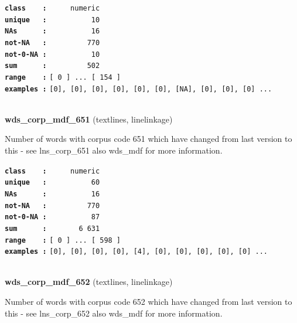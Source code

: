 \documentclass[]{article}
\begin{document}
\textbf{\texttt{class\ \ \ \ :}} \texttt{~~~~~numeric}\\
\textbf{\texttt{unique\ \ \ :}} \texttt{~~~~~~~~~~10}\\
\textbf{\texttt{NAs\ \ \ \ \ \ :}} \texttt{~~~~~~~~~~16}\\
\textbf{\texttt{not-NA\ \ \ :}} \texttt{~~~~~~~~~770}\\
\textbf{\texttt{not-0-NA\ :}} \texttt{~~~~~~~~~~10}\\
\textbf{\texttt{sum\ \ \ \ \ \ :}} \texttt{~~~~~~~~~502}\\
\textbf{\texttt{range\ \ \ \ :}}
\texttt{{[}\ 0\ {]}\ ...\ {[}\ 154\ {]}}\\
\textbf{\texttt{examples\ :}}
\texttt{{[}0{]},\ {[}0{]},\ {[}0{]},\ {[}0{]},\ {[}0{]},\ {[}0{]},\ {[}NA{]},\ {[}0{]},\ {[}0{]},\ {[}0{]}\ ...}\\

~

\textbf{wds\_corp\_mdf\_651} (textlines, linelinkage)

Number of words with corpus code 651 which have changed from last
version to this - see lns\_corp\_651 also wds\_mdf for more information.

\textbf{\texttt{class\ \ \ \ :}} \texttt{~~~~~numeric}\\
\textbf{\texttt{unique\ \ \ :}} \texttt{~~~~~~~~~~60}\\
\textbf{\texttt{NAs\ \ \ \ \ \ :}} \texttt{~~~~~~~~~~16}\\
\textbf{\texttt{not-NA\ \ \ :}} \texttt{~~~~~~~~~770}\\
\textbf{\texttt{not-0-NA\ :}} \texttt{~~~~~~~~~~87}\\
\textbf{\texttt{sum\ \ \ \ \ \ :}} \texttt{~~~~~~~6~631}\\
\textbf{\texttt{range\ \ \ \ :}}
\texttt{{[}\ 0\ {]}\ ...\ {[}\ 598\ {]}}\\
\textbf{\texttt{examples\ :}}
\texttt{{[}0{]},\ {[}0{]},\ {[}0{]},\ {[}0{]},\ {[}4{]},\ {[}0{]},\ {[}0{]},\ {[}0{]},\ {[}0{]},\ {[}0{]}\ ...}\\

~

\textbf{wds\_corp\_mdf\_652} (textlines, linelinkage)

Number of words with corpus code 652 which have changed from last
version to this - see lns\_corp\_652 also wds\_mdf for more information.
\end{document}

